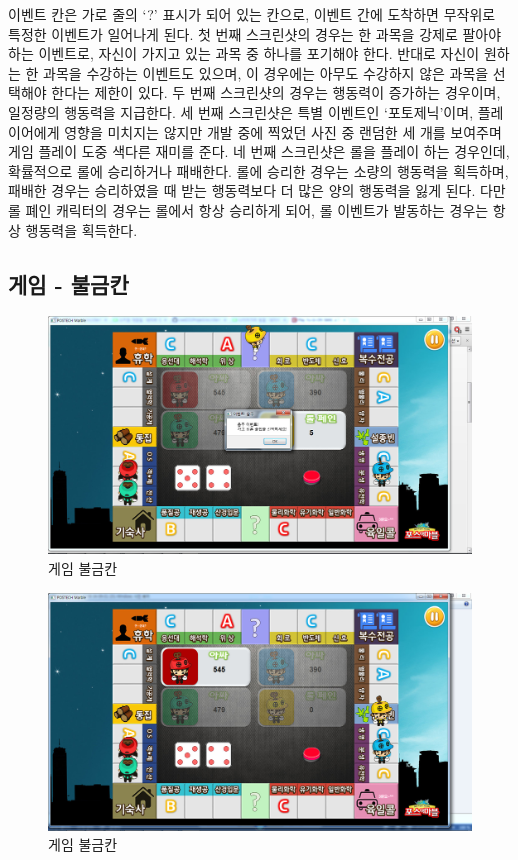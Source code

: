 \documentclass[10pt,oneside,a4paper,titlepage]{article}
\begin{document}
이벤트 칸은 가로 줄의 ‘?’ 표시가 되어 있는 칸으로, 이벤트 간에 도착하면 무작위로 특정한 이벤트가 일어나게 된다. 첫 번째 스크린샷의 경우는 한 과목을 강제로 팔아야 하는 이벤트로, 자신이 가지고 있는 과목 중 하나를 포기해야 한다. 반대로 자신이 원하는 한 과목을 수강하는 이벤트도 있으며, 이 경우에는 아무도 수강하지 않은 과목을 선택해야 한다는 제한이 있다. 두 번째 스크린샷의 경우는 행동력이 증가하는 경우이며, 일정량의 행동력을 지급한다. 세 번째 스크린샷은 특별 이벤트인 ‘포토제닉’이며, 플레이어에게 영향을 미치지는 않지만 개발 중에 찍었던 사진 중 랜덤한 세 개를 보여주며 게임 플레이 도중 색다른 재미를 준다. 네 번째 스크린샷은 롤을 플레이 하는 경우인데, 확률적으로 롤에 승리하거나 패배한다. 롤에 승리한 경우는 소량의 행동력을 획득하며, 패배한 경우는 승리하였을 때 받는 행동력보다 더 많은 양의 행동력을 잃게 된다. 다만 롤 폐인 캐릭터의 경우는 롤에서 항상 승리하게 되어, 롤 이벤트가 발동하는 경우는 항상 행동력을 획득한다.
 
\subsection{게임 - 불금칸}
\begin{figure}[H]
\centering
\centerline{\includegraphics[scale=0.65]{images/10firefriday}}
\caption{게임 불금칸}
\end{figure}

\begin{figure}[H]
\centering
\centerline{\includegraphics[scale=0.65]{images/10firefriday2}}
\caption{게임 불금칸}
\end{figure}
\end{document}
